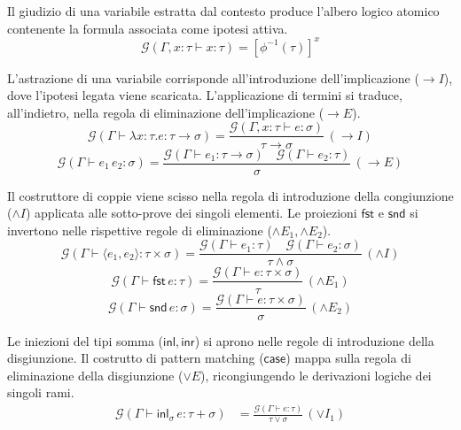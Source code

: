 \begin{description}[leftmargin=1.5em, style=nextline, font=\bfseries]
    \item[Variabile]
        Il giudizio di una variabile estratta dal contesto produce l'albero logico atomico contenente la formula associata come ipotesi attiva.
        $$ \mathcal{G}(\Gamma, x : \tau \vdash x : \tau) = [\phi^{-1}(\tau)]^x $$
    \item[Astrazione / Applicazione] 
        L'astrazione di una variabile corrisponde all'introduzione dell'implicazione ($\to I$), dove l'ipotesi legata viene scaricata. L'applicazione 
        di termini si traduce, all'indietro, nella regola di eliminazione dell'implicazione ($\to E$).
        $$ \mathcal{G}(\Gamma \vdash \lambda x:\tau. e : \tau \to \sigma) = \frac{\mathcal{G}(\Gamma, x:\tau \vdash e : \sigma)}{\tau \to \sigma} \, (\to I) $$
        $$ \mathcal{G}(\Gamma \vdash e_1 \, e_2 : \sigma) = \frac{\mathcal{G}(\Gamma \vdash e_1 : \tau \to \sigma) \quad \mathcal{G}(\Gamma \vdash e_2 : \tau)}{\sigma} \, (\to E) $$
    \item[Coppia / Proiezioni] 
        Il costruttore di coppie viene scisso nella regola di introduzione della congiunzione ($\land I$) applicata alle sotto-prove dei singoli elementi. Le proiezioni $\mathsf{fst}$ e $\mathsf{snd}$ si invertono nelle rispettive regole di eliminazione ($\land E_1, \land E_2$).
        $$ \mathcal{G}(\Gamma \vdash \langle e_1, e_2 \rangle : \tau \times \sigma) = 
            \frac{\mathcal{G}(\Gamma \vdash e_1 : \tau) \quad \mathcal{G}(\Gamma \vdash e_2 : \sigma)}{\tau \land \sigma} \, (\land I) $$
        $$ \mathcal{G}(\Gamma \vdash \mathsf{fst} \, e : \tau) = 
            \frac{\mathcal{G}(\Gamma \vdash e : \tau \times \sigma)}{\tau} \, (\land E_1) $$
        $$ \mathcal{G}(\Gamma \vdash \mathsf{snd} \, e : \sigma) = 
            \frac{\mathcal{G}(\Gamma \vdash e : \tau \times \sigma)}{\sigma} \, (\land E_2) $$
    \item[Iniezioni / Analisi per casi] 
        Le iniezioni del tipi somma ($\mathsf{inl}, \mathsf{inr}$) si aprono nelle regole di introduzione della disgiunzione. Il costrutto di pattern 
        matching ($\mathsf{case}$) mappa sulla regola di eliminazione della disgiunzione ($\lor E$), ricongiungendo le derivazioni logiche dei singoli rami.
        \begin{align*}
            \mathcal{G}(\Gamma \vdash \mathsf{inl}_{\sigma} \, e : \tau + \sigma) &= 
                \frac{\mathcal{G}(\Gamma \vdash e : \tau)}{\tau \lor \sigma} \, (\lor I_1) \\[0.4em]

\end{align*}
\end{description}
